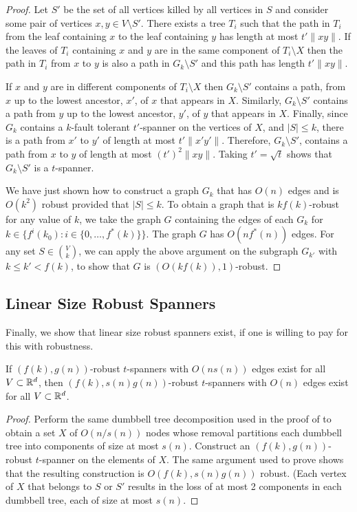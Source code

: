 \documentclass{patmorin}
\begin{document}
\begin{proof}
Let $S'$ be the set of all vertices killed by all vertices in $S$ and
consider some pair of vertices $x,y\in V\setminus S'$.  There exists a
tree $T_i$ such that the path in $T_i$ from the leaf containing $x$ to the
leaf containing $y$ has length at most $t'\|xy\|$.  If the leaves of $T_i$
containing $x$ and $y$ are in the same component of $T_i\setminus X$ then
the path in $T_i$ from $x$ to $y$ is also a path in $G_k\setminus S'$ and
this path has length $t'\|xy\|$.

If $x$ and $y$ are in different components of $T_i\setminus X$ then
$G_k\setminus S'$ contains a path, from $x$ up to the lowest ancestor,
$x'$, of $x$ that appears in $X$.  Similarly, $G_k\setminus S'$ contains
a path from $y$ up to the lowest ancestor, $y'$, of $y$ that appears
in $X$.  Finally, since $G_k$ contains a $k$-fault tolerant $t'$-spanner
on the vertices of $X$, and $|S|\le k$, there is a path from $x'$ to
$y'$ of length at most $t'\|x'y'\|$.  Therefore, $G_k\setminus S'$,
contains a path from $x$ to $y$ of length at most $(t')^2\|xy\|$.
Taking $t'=\sqrt{t}$ shows that $G_k\setminus S'$ is a $t$-spanner.

We have just shown how to construct a graph $G_k$ that has $O(n)$ edges
and is $O(k^2)$ robust provided that $|S|\le k$.  To obtain a graph that
is $kf(k)$-robust for any value of $k$, we take the graph $G$ containing
the edges of each $G_k$ for $k\in\{f^i(k_0) : i\in\{0,\ldots,f^*(k)\}\}$.
The graph $G$ has $O(nf^*(n))$ edges.  For any set $S\in \binom{V}{k}$,
we can apply the above argument on the subgraph $G_{k'}$ with $k \le k'
< f(k)$, to show that $G$ is $(O(kf(k)),1)$-robust.
\end{proof}

\subsection{Linear Size Robust Spanners}

Finally, we show that linear size robust spanners exist, if one is willing
to pay for this with robustness.

\begin{thm}
If $(f(k),g(n))$-robust $t$-spanners with $O(n s(n))$ edges exist for all
$V\subset\mathbb{R}^d$, then $(f(k),s(n)g(n))$-robust $t$-spanners with $O(n)$
edges exist for all $V\subset\mathbb{R}^d$.
\end{thm}

\begin{proof}
Perform the same dumbbell tree decomposition used in the proof of
 to obtain a set $X$ of $O(n/s(n))$ nodes whose removal
partitions each dumbbell tree into components of size at most $s(n)$.
Construct an $(f(k),g(n))$-robust $t$-spanner on the elements of $X$.  The
same argument used to prove  shows that the resulting
construction is $O(f(k),s(n)g(n))$ robust.  (Each vertex of $X$ that
belongs to $S$ or $S'$ results in the loss of at most 2 components in each
dumbbell tree, each of size at most $s(n)$.
\end{proof}
\end{document}
